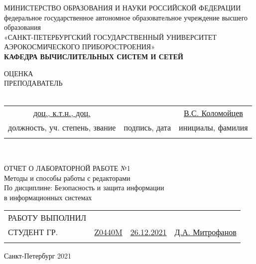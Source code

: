 \documentclass[a4paper]{article}
\begin{document}
\begin{center}
	\hfill \break
	\small{МИНИСТЕРСТВО ОБРАЗОВАНИЯ И НАУКИ РОССИЙСКОЙ ФЕДЕРАЦИИ}\\
	\footnotesize{федеральное государственное автономное образовательное учреждение высшего}\\ 
	\footnotesize{образования}\\
	\small{«САНКТ-ПЕТЕРБУРГСКИЙ ГОСУДАРСТВЕННЫЙ УНИВЕРСИТЕТ АЭРОКОСМИЧЕСКОГО ПРИБОРОСТРОЕНИЯ»}\\
	\hfill \break
	\small{\textbf{КАФЕДРА ВЫЧИСЛИТЕЛЬНЫХ СИСТЕМ И СЕТЕЙ}}\\
	\hfill \break
	\hfill \break
	\hfill \break
	\hfill \break
\end{center}
\normalsize{ОЦЕНКА\\
	ПРЕПОДАВАТЕЛЬ}\\\\
\begin{tabular}{c c c}
	\underline{\hspace{0.8cm}доц., к.т.н., доц.\hspace{0.8cm}}   & \underline{\hspace{1cm} \phantom{ц baseline hack} } & \underline{\hspace{0.8cm}В.С. Коломойцев\hspace{0.8cm}} \\
	\hfill\break
	\footnotesize{должность, уч. степень, звание} & \footnotesize{подпись, дата}              & \footnotesize{инициалы, фамилия}                     \\\\
\end{tabular}\\
\hfill \break
\hfill \break
\begin{center}
	\normalsize{ОТЧЕТ О ЛАБОРАТОРНОЙ РАБОТЕ №1\\
		\hfill \break
		Методы и способы работы с редакторами\\
		\hfill \break
		По дисциплине: Безопасность и защита информации\\
		в информационных системах}\\
	\hfill \break
	\hfill \break
\end{center}
\begin{tabular}{l c c c}
	РАБОТУ ВЫПОЛНИЛ\\
	СТУДЕНТ ГР. & \ul{  Z0440M  } & \ul{  26.12.2021  } & \underline{\hspace{0.4cm}Д.А. Митрофанов\hspace{0.4cm}} \\
	\hfill\break
\end{tabular}\hfill \break
\hfill \break
\hfill \break
\hfill \break
\hfill \break
\hfill \break
\begin{center}Санкт-Петербург 2021 \end{center}
\thispagestyle{empty}
\newpage
\end{document}
